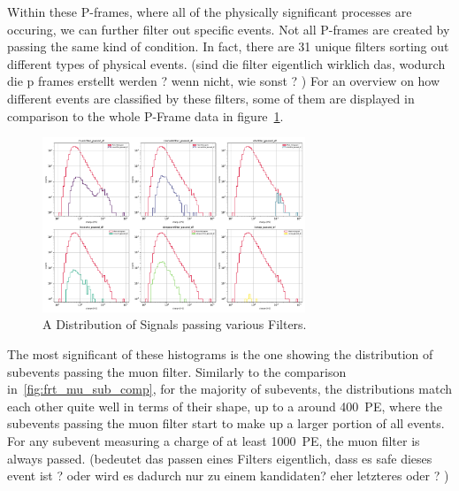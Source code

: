 Within these P-frames, where all of the physically significant processes are occuring, we can further filter out specific events. Not all P-frames are created by 
passing the same kind of condition. In fact, there are \num{31} unique filters sorting out different types of physical events. (sind die filter eigentlich wirklich 
das, wodurch die p frames erstellt werden ? wenn nicht, wie sonst ? )
For an overview on how different events are classified by these filters, some of them are displayed in comparison to the whole P-Frame data in 
figure~\ref{fig:filtermask}. 

\begin{figure}
    \centering
    \includegraphics[width=0.7\textwidth]{Plots/selected_filters_subplot.pdf}
    \caption{A Distribution of Signals passing various Filters.}
    \label{fig:filtermask}
\end{figure}

The most significant of these histograms is the one showing the distribution of subevents passing the muon filter. 
Similarly to the comparison in~\ref{fig:frt_mu_sub_comp}, for the majority of subevents, the distributions match each other quite well in terms of their shape, up 
to a around \num{400}~\unit{PE}, where the subevents passing the muon filter start to make up a larger portion of all events. For any subevent measuring a charge of 
at least \num{1000}~\unit{PE}, the muon filter is always passed. (bedeutet das passen eines Filters eigentlich, dass es safe dieses event ist ? oder wird es dadurch nur
zu einem kandidaten? eher letzteres oder ? ) 





